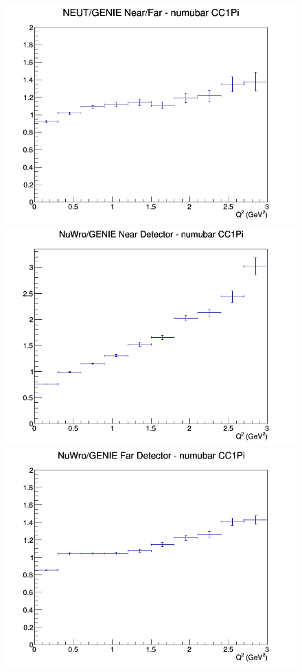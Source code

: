 \documentclass[12pt]{article}
\begin{document}
\begin{figure}[h]
\endminipage
{}
\includegraphics[width=\linewidth]{eff_Q2/GAr/ratios/CC1Pi_NEUT_GENIE_numubar_NF_Q2.png}
\endminipage
\newline
{}
\includegraphics[width=\linewidth]{eff_Q2/GAr/ratios/CC1Pi_NuWro_GENIE_numubar_near_Q2.png}
\endminipage
{}
\includegraphics[width=\linewidth]{eff_Q2/GAr/ratios/CC1Pi_NuWro_GENIE_numubar_far_Q2.png}

\end{figure}
\end{document}
